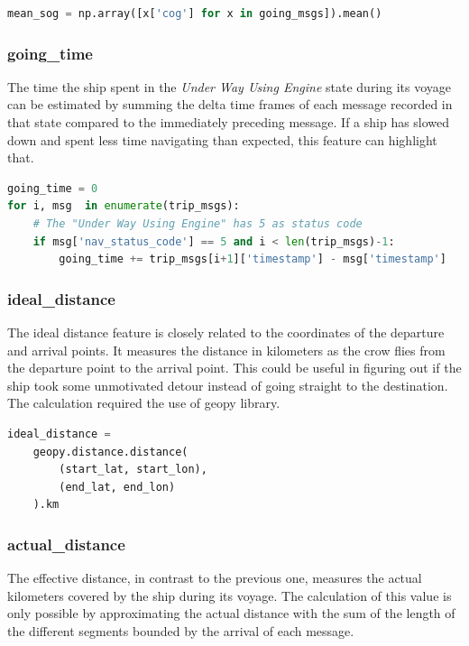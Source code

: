     \begin{lstlisting}[language=Python]
mean_sog = np.array([x['cog'] for x in going_msgs]).mean()
    \end{lstlisting} 
    
    \subsubsection{going\_time}
    The time the ship spent in the \textit{Under Way Using Engine} state during its voyage can be estimated by summing the delta time frames of each message recorded in that state compared to the immediately preceding message. If a ship has slowed down and spent less time navigating than expected, this feature can highlight that.
    
    \begin{lstlisting}[language=Python]
going_time = 0
for i, msg  in enumerate(trip_msgs):
    # The "Under Way Using Engine" has 5 as status code 
    if msg['nav_status_code'] == 5 and i < len(trip_msgs)-1:
        going_time += trip_msgs[i+1]['timestamp'] - msg['timestamp']
    \end{lstlisting} 

    
    \subsubsection{ideal\_distance}
    
    The ideal distance feature is closely related to the coordinates of the departure and arrival points. It measures the distance in kilometers as the crow flies from the departure point to the arrival point. This could be useful in figuring out if the ship took some unmotivated detour instead of going straight to the destination.
    \\
    The calculation required the use of geopy \cite{geopy} library.
    
    \begin{lstlisting}[language=Python]
ideal_distance =
    geopy.distance.distance(
        (start_lat, start_lon),
        (end_lat, end_lon)
    ).km
    \end{lstlisting} 
    
    \subsubsection{actual\_distance}
    
    The effective distance, in contrast to the previous one, measures the actual kilometers covered by the ship during its voyage. The calculation of this value is only possible by approximating the actual distance with the sum of the length of the different segments bounded by the arrival of each message.
    
